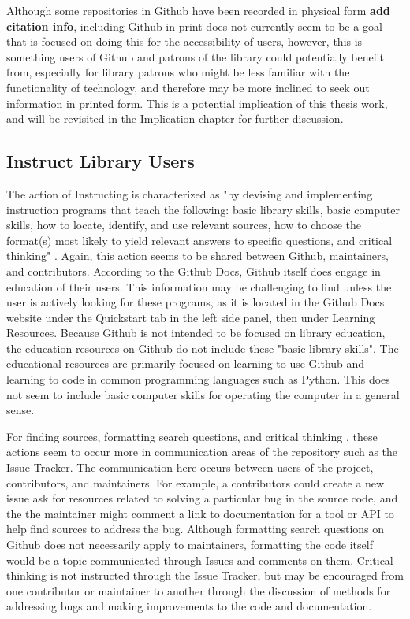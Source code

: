 Although some repositories in Github have been recorded in physical form \textbf{add citation info}, including Github in print does not currently seem to be a goal that is focused on doing this for the accessibility of users, however, this is something users of Github and patrons of the library could potentially benefit from, especially for library patrons who might be less familiar with the functionality of technology, and therefore may be more inclined to seek out information in printed form. This is a potential implication of this thesis work, and will be revisited in the Implication chapter for further discussion. 

\subsection{Instruct Library Users}
The action of Instructing is characterized as "by devising and implementing instruction programs that teach the following: basic library skills, basic computer skills, how to locate, identify, and use relevant sources, how to choose the format(s) most likely to yield relevant answers to specific questions, and critical thinking" \cite{gorman2000values}. Again, this action seems to be shared between Github, maintainers, and contributors. According to the Github Docs, Github itself does engage in education of their users. This information may be challenging to find unless the user is actively looking for these programs, as it is located in the Github Docs website under the Quickstart tab in the left side panel, then under Learning Resources. Because Github is not intended to be focused on library education, the education resources on Github do not include these "basic library skills". The educational resources are primarily focused on learning to use Github and learning to code in common programming languages such as Python. This does not seem to include basic computer skills for operating the computer in a general sense. 

For finding sources, formatting search questions, and critical thinking \cite{gorman2000values}, these actions seem to occur more in communication areas of the repository such as the Issue Tracker. The communication here occurs between users of the project, contributors, and maintainers. For example, a contributors could create a new issue ask for resources related to solving a particular bug in the source code, and the the maintainer might comment a link to documentation for a tool or API to help find sources to address the bug. Although formatting search questions on Github does not necessarily apply to maintainers, formatting the code itself would be a topic communicated through Issues and comments on them. Critical thinking is not instructed through the Issue Tracker, but may be encouraged from one contributor or maintainer to another through the discussion of methods for addressing bugs and making improvements to the code and documentation.

